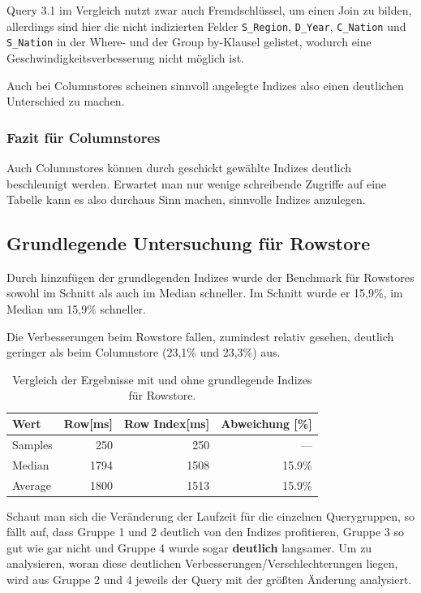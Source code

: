 Query 3.1 im Vergleich nutzt zwar auch Fremdschlüssel, um einen Join zu bilden,
allerdings sind hier die nicht indizierten Felder \verb+S_Region+, \verb+D_Year+,
\verb+C_Nation+ und \verb+S_Nation+ in der Where- und der Group by-Klausel gelistet,
wodurch eine Geschwindigkeitsverbesserung nicht möglich ist.

Auch bei Columnstores scheinen sinnvoll angelegte Indizes also einen deutlichen Unterschied zu machen.

\subsubsection{Fazit für Columnstores}
Auch Columnstores können durch geschickt gewählte Indizes deutlich beschleunigt werden. Erwartet man nur wenige schreibende Zugriffe auf eine Tabelle kann es also durchaus Sinn machen, sinnvolle Indizes anzulegen.

\subsection{Grundlegende Untersuchung für Rowstore}
Durch hinzufügen der grundlegenden Indizes wurde der Benchmark
für Rowstores sowohl im Schnitt als auch im Median schneller.
Im Schnitt wurde er 15,9\%, im Median um 15,9\% schneller.

Die Verbesserungen beim Rowstore fallen, zumindest relativ gesehen, deutlich geringer als beim Columnstore (23,1\% und 23,3\%) aus.

\begin{table}[H]
    \begin{tabularx}{\textwidth}{lrrr}
        \toprule
        Wert                & Row[ms] & Row Index[ms]   & Abweichung [\%]\\
        \toprule
        Samples             & 250      & 250            &   ---    \\
        \midrule
        Median              & 1794     & 1508           &  15.9\%     \\
        Average             & 1800     & 1513           &  15.9\%     \\
        \bottomrule
    \end{tabularx}
\caption{Vergleich der Ergebnisse mit und ohne grundlegende Indizes für Rowstore.}
\label{tab:basic_index_row}
\end{table}

Schaut man sich die Veränderung der Laufzeit für die einzelnen Querygruppen, so fällt auf, dass Gruppe 1 und 2 deutlich von den Indizes profitieren, Gruppe 3 so gut wie gar nicht und Gruppe 4 wurde sogar \textbf{deutlich} langsamer.
Um zu analysieren, woran diese deutlichen Verbesserungen/Verschlechterungen liegen, wird aus Gruppe 2 und 4 jeweils der Query mit der größten Änderung analysiert.

